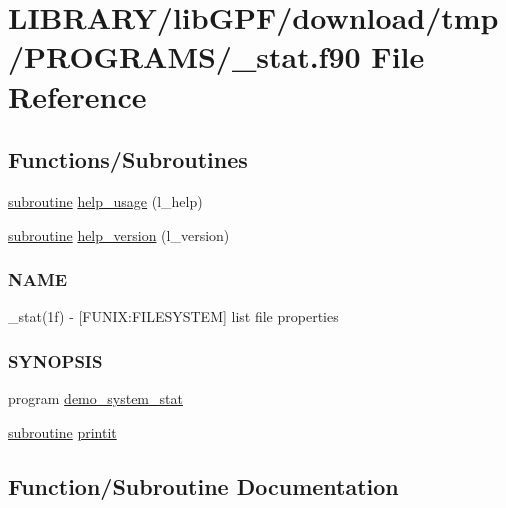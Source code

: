 \hypertarget{__stat_8f90}{}\section{L\+I\+B\+R\+A\+R\+Y/lib\+G\+P\+F/download/tmp/\+P\+R\+O\+G\+R\+A\+M\+S/\+\_\+stat.f90 File Reference}
\label{__stat_8f90}
\subsection*{Functions/\+Subroutines}
\begin{DoxyCompactItemize}
\item 
\hyperlink{M__stopwatch_83_8txt_acfbcff50169d691ff02d4a123ed70482}{subroutine} \hyperlink{__stat_8f90_a3e09a3b52ee8fb04eeb93fe5761626a8}{help\+\_\+usage} (l\+\_\+help)
\item 
\hyperlink{M__stopwatch_83_8txt_acfbcff50169d691ff02d4a123ed70482}{subroutine} \hyperlink{__stat_8f90_a39c21619b08a3c22f19e2306efd7f766}{help\+\_\+version} (l\+\_\+version)
\begin{DoxyCompactList}\small\item\em \subsubsection*{N\+A\+ME}

\+\_\+stat(1f) -\/ \mbox{[}F\+U\+N\+IX\+:F\+I\+L\+E\+S\+Y\+S\+T\+EM\mbox{]} list file properties \subsubsection*{S\+Y\+N\+O\+P\+S\+IS}\end{DoxyCompactList}\item 
program \hyperlink{__stat_8f90_adf8b7aa887ea1a5d211153cc019facf4}{demo\+\_\+system\+\_\+stat}
\item 
\hyperlink{M__stopwatch_83_8txt_acfbcff50169d691ff02d4a123ed70482}{subroutine} \hyperlink{__stat_8f90_a9ea6ab9cdaa05a5fc3ac6e5448b11c68}{printit}
\end{DoxyCompactItemize}


\subsection{Function/\+Subroutine Documentation}
\mbox{\label{__stat_8f90_adf8b7aa887ea1a5d211153cc019facf4}} 
